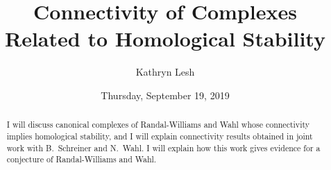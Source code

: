 \documentclass{UAmathtalk}
\author{Kathryn Lesh}
\title{Connectivity of Complexes\\ Related to Homological Stability}
\date{Thursday, September 19, 2019}
\begin{document}
\maketitle

\begin{abstract}
I will discuss canonical complexes of Randal-Williams and Wahl whose connectivity implies homological stability, and I will explain connectivity results obtained in joint work with B.~Schreiner and N.~Wahl. I will explain how this work gives evidence for a conjecture of Randal-Williams and Wahl.
\end{abstract}
\end{document}
